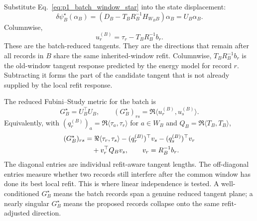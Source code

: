 \documentclass[10pt,twocolumn]{article}
\begin{document}
Substitute Eq.~\eqref{eq:p1_batch_window_star} into the state displacement:
\begin{equation}
\delta\psi_B^\star(\alpha_B)
=
\left(D_B-T_BR_B^{-1}H_{W_BB}\right)\alpha_B
=U_B\alpha_B.
\label{eq:p1_batch_reduced_step}
\end{equation}
Columnwise,
\begin{equation}
u_r^{(B)}=\tau_r-T_BR_B^{-1}b_r.
\label{eq:p1_batch_reduced_tangent}
\end{equation}
These are the batch-reduced tangents.  They are the directions that remain
after all records in \(B\) share the same inherited-window refit.
Columnwise, \(T_BR_B^{-1}b_r\) is the old-window tangent response predicted by
the energy model for record \(r\).  Subtracting it forms the part of the
candidate tangent that is not already supplied by the local refit response.

The reduced Fubini--Study metric for the batch is
\begin{equation}
G_B^\star=U_B^\top U_B,
\qquad
(G_B^\star)_{rs}
=\Re\langle u_r^{(B)},u_s^{(B)}\rangle.
\label{eq:p1_batch_gram}
\end{equation}
Equivalently, with
\((q_r^{(B)})_a=\Re\langle\tau_a,\tau_r\rangle\) for \(a\in W_B\) and
\(Q_B=\Re\langle T_B,T_B\rangle\),
\begin{align}
(G_B^\star)_{rs}
&=
\Re\langle\tau_r,\tau_s\rangle
-(q_r^{(B)})^\top v_s
-(q_s^{(B)})^\top v_r
\notag\\
&\quad
+v_r^\top Q_Bv_s,
\qquad
v_r=R_B^{-1}b_r.
\label{eq:p1_batch_gram_expanded}
\end{align}
The diagonal entries are individual refit-aware tangent lengths.  The
off-diagonal entries measure whether two records still interfere after the
common window has done its best local refit.
This is where linear independence is tested.  A well-conditioned
\(G_B^\star\) means the batch records span a genuine reduced tangent plane; a
nearly singular \(G_B^\star\) means the proposed records collapse onto the
same refit-adjusted direction.
\end{document}
